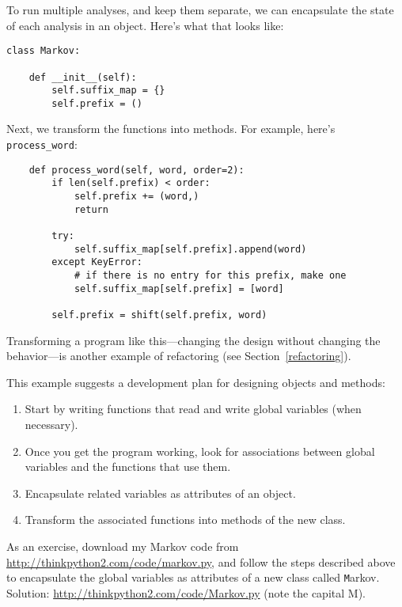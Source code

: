 \documentclass[
DIV=11,
fontsize=13,
twoside,
headinclude=false,
titlepage=firstiscover,
abstract=true,
headsepline=true,
footsepline=true,
chapterprefix=true, %
headings=big,
bibliography=totoc,%
captions=tableheading
]{scrbook}
\theoremstyle{definition}
\begin{document}
To run multiple analyses, and keep them separate, we can encapsulate
the state of each analysis in an object.
Here's what that looks like:

\begin{lstlisting}
class Markov:

    def __init__(self):
        self.suffix_map = {}
        self.prefix = ()    
\end{lstlisting}

Next, we transform the functions into methods.  For example,
here's \verb"process_word":

\begin{lstlisting}
    def process_word(self, word, order=2):
        if len(self.prefix) < order:
            self.prefix += (word,)
            return

        try:
            self.suffix_map[self.prefix].append(word)
        except KeyError:
            # if there is no entry for this prefix, make one
            self.suffix_map[self.prefix] = [word]

        self.prefix = shift(self.prefix, word)        
\end{lstlisting}

Transforming a program like this---changing the design without
changing the behavior---is another example of refactoring
(see Section~\ref{refactoring}).

This example suggests a development plan for designing objects and
methods:

\begin{enumerate}

\item Start by writing functions that read and write global
variables (when necessary).

\item Once you get the program working, look for associations
between global variables and the functions that use them.

\item Encapsulate related variables as attributes of an object.

\item Transform the associated functions into methods of the new
class.

\end{enumerate}

As an exercise, download my Markov code from
\url{http://thinkpython2.com/code/markov.py}, and follow the steps
described above to encapsulate the global variables as attributes of a
new class called {\texttt Markov}.  Solution:
\url{http://thinkpython2.com/code/Markov.py} (note the capital M).
\end{document}
